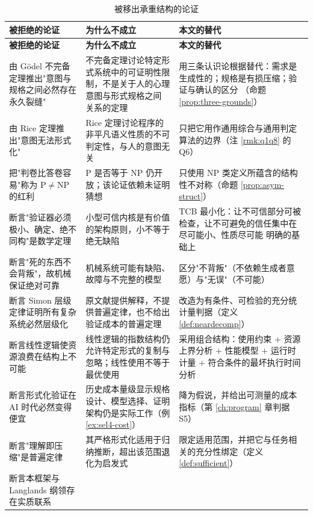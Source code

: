 \begin{longtable}{L{3.4cm}L{5.2cm}L{5.6cm}}
\caption{被移出承重结构的论证}\label{tab:overreach}\\
\toprule
\textbf{被拒绝的论证} & \textbf{为什么不成立} & \textbf{本文的替代} \\
\midrule
\endfirsthead
\toprule
\textbf{被拒绝的论证} & \textbf{为什么不成立} & \textbf{本文的替代} \\
\midrule
\endhead
\bottomrule
\endlastfoot
由 Gödel 不完备定理推出"意图与规格之间必然存在永久裂缝" &
  不完备定理讨论特定形式系统中的可证明性限制，不是关于人的心理意图与形式规格之间
  关系的定理 &
  用三条认识论根据替代：需求是生成性的；规格是有损压缩；验证与确认的区分
  （命题 \ref{prop:three-grounds}） \\
由 Rice 定理推出"意图无法形式化" &
  Rice 定理讨论程序的非平凡语义性质的不可判定性，与人的意图无关 &
  只把它用作通用综合与通用判定算法的边界（注 \ref{rmk:q1q8} 的 Q6） \\
把"判卷比答卷容易"称为 $\mathrm{P}\neq\mathrm{NP}$ 的红利 &
  $\mathrm{P}$ 是否等于 $\mathrm{NP}$ 仍开放；该论证依赖未证明猜想 &
  只使用 $\mathrm{NP}$ 类定义所蕴含的结构性不对称（命题
  \ref{prop:asym-struct}） \\
断言"验证器必须极小、确定、绝不同构"是数学定理 &
  小型可信内核是有价值的架构原则，小不等于绝无缺陷 &
  TCB 最小化：让不可信部分可被检查，让不可避免的信任集中在尽可能小、性质尽可能
  明确的基础上 \\
断言"死的东西不会背叛"，故机械保证绝对可靠 &
  机械系统可能有缺陷、故障与不完整的模型 &
  区分"不背叛"（不依赖生成者意愿）与"无误"（不可能） \\
断言 Simon 层级定律证明所有复杂系统必然层级化 &
  原文献提供解释，不提供普遍定律，也不给出验证成本的普遍定理 &
  改造为有条件、可检验的充分统计量判据（定义 \ref{def:neardecomp}） \\
断言线性逻辑使资源浪费在结构上不可能 &
  线性逻辑的指数结构仍允许特定形式的复制与忽略；线性使用不等于最优使用 &
  采用组合结构：使用约束 $+$ 资源上界分析 $+$ 性能模型 $+$ 运行时计量 $+$
  符合条件的最坏执行时间分析 \\
断言形式化验证在 AI 时代必然变得便宜 &
  历史成本量级显示规格设计、模型选择、证明架构仍是实际工作（例
  \ref{ex:sel4-cost}） &
  降为假说，并给出可测量的成本指标（第 \ref{ch:program} 章判据 S5） \\
断言"理解即压缩"是普遍定律 &
  其严格形式化适用于归纳推断，超出该范围退化为启发式 &
  限定适用范围，并把它与任务相关的充分性绑定（定义 \ref{def:sufficient}） \\
断言本框架与 Langlands 纲领存在实质联系 &

\end{longtable}
